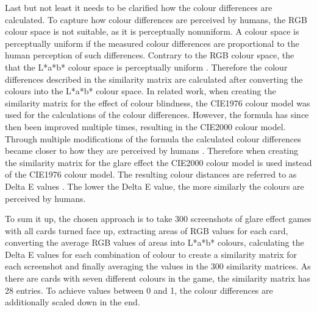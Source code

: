 Last but not least it needs to be clarified how the colour differences are calculated. To capture how colour differences are perceived by humans, the RGB colour space is not suitable, as it is perceptually nonuniform. A colour space is perceptually uniform if the measured colour differences are proportional to the human perception of such differences. Contrary to the RGB colour space, the that the L*a*b* colour space is perceptually uniform \cite{rgb_not}. Therefore the colour differences described in the similarity matrix are calculated after converting the colours into the L*a*b* colour space. In related work, when creating the similarity matrix for the effect of colour blindness, the CIE1976 colour model was used for the calculations \cite{blind} of the colour differences. However, the formula has since then been improved multiple times, resulting in the CIE2000 colour model. Through multiple modifications of the formula the calculated colour differences became closer to how they are perceived by humans \cite{fischer}. Therefore when creating the similarity matrix for the glare effect the CIE2000 colour model is used instead of the CIE1976 colour model. The resulting colour distances are referred to as Delta E values \cite{fischer}. The lower the Delta E value, the more similarly the colours are perceived by humans.

To sum it up, the chosen approach is to take 300 screenshots of glare effect games with all cards turned face up, extracting areas of RGB values for each card, converting the average RGB values of areas into L*a*b* colours, calculating the Delta E values for each combination of colour to create a similarity matrix for each screenshot and finally averaging the values in the 300 similarity matrices. As there are cards with seven different colours in the game, the similarity matrix has 28 entries. To achieve values between 0 and 1, the colour differences are additionally scaled down in the end.
 
